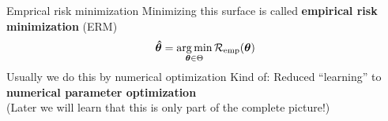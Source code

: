 \documentclass[11pt,compress,t,notes=noshow, xcolor=table]{beamer}
\begin{document}
\begin{frame2}{Emprical risk minimization}
Minimizing this surface is called \textbf{empirical risk minimization} (ERM)
$$
\bm{\hat\theta} = \mathop{\mathrm{arg\,min}}_{\bm{\theta} \in \Theta} \mathcal{R}_{\text{emp}}(\bm{\theta})
$$
Usually we do this by numerical optimization
\vfill
Kind of: Reduced ``learning'' to \textbf{numerical parameter optimization}\\
(Later we will learn that this is only part of the complete picture!)
\end{frame2}

\endlecture
\end{document}
